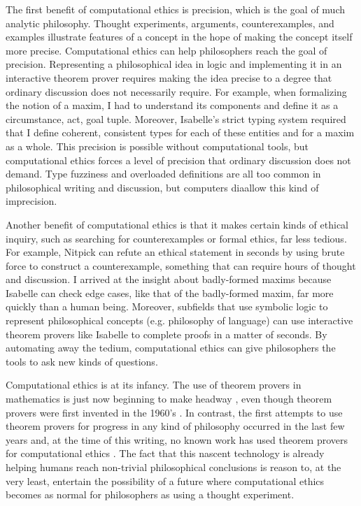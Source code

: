 \begin{isabellebody}
\begin{isamarkuptext}
The first benefit of computational ethics is precision, which is the goal of much analytic
philosophy. Thought experiments, arguments, counterexamples, and examples 
illustrate features of a concept in the hope of making the concept itself more precise. Computational 
ethics can help philosophers reach the goal of precision. Representing a philosophical idea in logic 
and implementing it in an interactive theorem prover requires making the idea precise to a degree 
that ordinary discussion does not necessarily require. For example, when formalizing the notion of a 
maxim, I had to understand its components and define it as a circumstance, act, goal tuple. Moreover, 
Isabelle's strict typing system required that I define coherent, consistent types for each of these 
entities and for a maxim as a whole. This precision is possible without computational tools, but 
computational ethics forces a level of precision that ordinary discussion does not demand. Type 
fuzziness and overloaded definitions are all too common in philosophical writing and 
discussion, but computers diaallow this kind of imprecision.

Another benefit of computational ethics is that it makes certain kinds of ethical inquiry, such as 
searching for counterexamples or formal ethics, far less tedious. For example, Nitpick can refute 
an ethical statement in seconds by using brute force to construct a counterexample, something that can require hours
of thought and discussion. I arrived at the insight about badly-formed maxims because Isabelle 
can check edge cases, like that of the badly-formed maxim, far more quickly than a human being. Moreover, 
subfields that use symbolic logic to represent philosophical concepts (e.g. philosophy of language) can 
use interactive theorem provers like Isabelle to complete proofs in a matter of seconds. By automating 
away the tedium, computational ethics can give philosophers the tools to ask new kinds of questions.

Computational ethics is at its infancy. The use of theorem provers in mathematics is just now beginning 
to make headway \citep{buzzardvideo}, even though theorem provers were first invented in the 1960's \citep{historyofITP}. 
In contrast, the first attempts to use theorem provers for progress in any kind of philosophy occurred 
in the last few years \color{red} and, at the time of this writing, no known work has used theorem 
provers for computational ethics \color{black}. The 
fact that this nascent technology is already helping humans reach non-trivial philosophical conclusions 
is reason to, at the very least, entertain the possibility of a future where computational ethics 
becomes as normal for philosophers as using a thought experiment.


\end{isamarkuptext}
\end{isabellebody}
